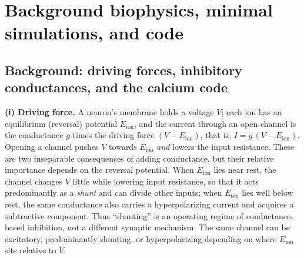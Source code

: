 \documentclass[11pt,a4paper]{article}
\begin{document}
\section{Background biophysics, minimal simulations, and code}\label{app:sim}
\subsection{Background: driving forces, inhibitory conductances, and the calcium code}\label{app:bg}

\textbf{(i) Driving force.} A neuron's membrane holds a voltage $V$; each ion has an equilibrium (reversal) potential $E_{\mathrm{ion}}$, and the current through an open channel is the conductance $g$ times the driving force $(V-E_{\mathrm{ion}})$, that is, $I = g\,(V - E_{\mathrm{ion}})$. 
Opening a channel pushes $V$ towards $E_{\mathrm{ion}}$ \emph{and} lowers the input resistance. These are two inseparable consequences of adding conductance, but their relative importance depends on the reversal potential. When $E_{\mathrm{ion}}$ lies near rest, the channel changes $V$ little while lowering input resistance, so that it acts predominantly as a \emph{shunt} and can divide other inputs; when $E_{\mathrm{ion}}$ lies well below rest, the same conductance also carries a hyperpolarizing current and acquires a subtractive component. Thus ``shunting'' is an operating regime of conductance-based inhibition, not a different synaptic mechanism. The same channel can be excitatory, predominantly shunting, or hyperpolarizing depending on where $E_{\mathrm{ion}}$ sits relative to $V$.
\end{document}
